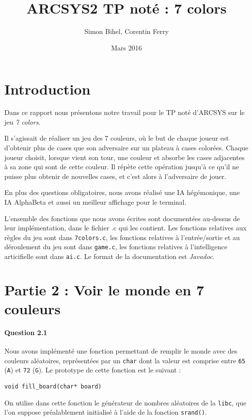 \documentclass[a4paper]{article}
\title{ARCSYS2 TP noté : 7 colors}
\author{Simon Bihel, Corentin Ferry}
\date{Mars 2016}
\begin{document}
    \maketitle

    \section{Introduction}
    Dans ce rapport nous présentons notre travail pour le TP noté d'ARCSYS sur 
    le jeu \emph{7 colors}. 
    
    Il s'agissait de réaliser un jeu des 7 couleurs, où le but de chaque joueur 
est d'obtenir plus de cases que son adversaire sur un plateau à cases colorées.
Chaque joueur choisit, lorsque vient son tour, une couleur et absorbe les cases 
adjacentes à sa zone qui sont de cette couleur. Il répète cette opération 
jusqu'à ce qu'il ne puisse plus obtenir de nouvelles cases, et c'est alors à 
l'adversaire de jouer.
    
    En plus des questions obligatoires, nous avons réalisé une IA hégémonique, 
une IA AlphaBeta et aussi un meilleur affichage pour le terminal.

    L'ensemble des fonctions que nous avons écrites sont documentées au-dessus 
de leur implémentation, dans le fichier .c qui les contient. Les fonctions 
relatives aux règles du jeu sont dans \texttt{7colors.c}, les fonctions 
relatives à l'entrée/sortie et au déroulement du jeu sont dans \texttt{game.c}, 
les fonctions relatives à l'intelligence articifielle sont dans \texttt{ai.c}.
Le format de la documentation est \emph{Javadoc}.

    \section{Partie 2 : Voir le monde en 7 couleurs}
    \paragraph{Question 2.1}
    Nous avons implémenté une fonction permettant de remplir le monde avec
des couleurs aléatoires, représentées par un \texttt{char} dont la valeur est
comprise entre \texttt{65} (\texttt{A}) et \texttt{72} (\texttt{G}).
Le prototype de cette fonction est le suivant :
\begin{lstlisting}
void fill_board(char* board)
\end{lstlisting}
On utilise dans cette fonction le générateur de nombres aléatoires de la
\texttt{libc}, que l'on suppose préalablement initialisé à l'aide de la
fonction \texttt{srand()}.
\end{document}
